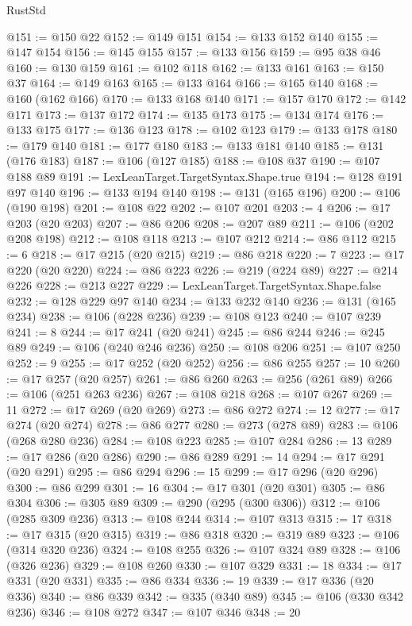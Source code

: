 \begin{lexlean}{RustStd}
\begin{coremodule}
@151 := @150 @22
@152 := @149 @151
@154 := @133 @152 @140
@155 := @147 @154
@156 := @145 @155
@157 := @133 @156
@159 := @95 @38 @46
@160 := @130 @159
@161 := @102 @118
@162 := @133 @161
@163 := @150 @37
@164 := @149 @163
@165 := @133 @164
@166 := @165 @140
@168 := @160 (@162 @166)
@170 := @133 @168 @140
@171 := @157 @170
@172 := @142 @171
@173 := @137 @172
@174 := @135 @173
@175 := @134 @174
@176 := @133 @175
@177 := @136 @123
@178 := @102 @123
@179 := @133 @178
@180 := @179 @140
@181 := @177 @180
@183 := @133 @181 @140
@185 := @131 (@176 @183)
@187 := @106 (@127 @185)
@188 := @108 @37
@190 := @107 @188 @89
@191 := LexLeanTarget.TargetSyntax.Shape.true
@194 := @128 @191 @97 @140
@196 := @133 @194 @140
@198 := @131 (@165 @196)
@200 := @106 (@190 @198)
@201 := @108 @22
@202 := @107 @201
@203 := 4
@206 := @17 @203 (@20 @203)
@207 := @86 @206
@208 := @207 @89
@211 := @106 (@202 @208 @198)
@212 := @108 @118
@213 := @107 @212
@214 := @86 @112
@215 := 6
@218 := @17 @215 (@20 @215)
@219 := @86 @218
@220 := 7
@223 := @17 @220 (@20 @220)
@224 := @86 @223
@226 := @219 (@224 @89)
@227 := @214 @226
@228 := @213 @227
@229 := LexLeanTarget.TargetSyntax.Shape.false
@232 := @128 @229 @97 @140
@234 := @133 @232 @140
@236 := @131 (@165 @234)
@238 := @106 (@228 @236)
@239 := @108 @123
@240 := @107 @239
@241 := 8
@244 := @17 @241 (@20 @241)
@245 := @86 @244
@246 := @245 @89
@249 := @106 (@240 @246 @236)
@250 := @108 @206
@251 := @107 @250
@252 := 9
@255 := @17 @252 (@20 @252)
@256 := @86 @255
@257 := 10
@260 := @17 @257 (@20 @257)
@261 := @86 @260
@263 := @256 (@261 @89)
@266 := @106 (@251 @263 @236)
@267 := @108 @218
@268 := @107 @267
@269 := 11
@272 := @17 @269 (@20 @269)
@273 := @86 @272
@274 := 12
@277 := @17 @274 (@20 @274)
@278 := @86 @277
@280 := @273 (@278 @89)
@283 := @106 (@268 @280 @236)
@284 := @108 @223
@285 := @107 @284
@286 := 13
@289 := @17 @286 (@20 @286)
@290 := @86 @289
@291 := 14
@294 := @17 @291 (@20 @291)
@295 := @86 @294
@296 := 15
@299 := @17 @296 (@20 @296)
@300 := @86 @299
@301 := 16
@304 := @17 @301 (@20 @301)
@305 := @86 @304
@306 := @305 @89
@309 := @290 (@295 (@300 @306))
@312 := @106 (@285 @309 @236)
@313 := @108 @244
@314 := @107 @313
@315 := 17
@318 := @17 @315 (@20 @315)
@319 := @86 @318
@320 := @319 @89
@323 := @106 (@314 @320 @236)
@324 := @108 @255
@326 := @107 @324 @89
@328 := @106 (@326 @236)
@329 := @108 @260
@330 := @107 @329
@331 := 18
@334 := @17 @331 (@20 @331)
@335 := @86 @334
@336 := 19
@339 := @17 @336 (@20 @336)
@340 := @86 @339
@342 := @335 (@340 @89)
@345 := @106 (@330 @342 @236)
@346 := @108 @272
@347 := @107 @346
@348 := 20

\end{coremodule}
\end{lexlean}
